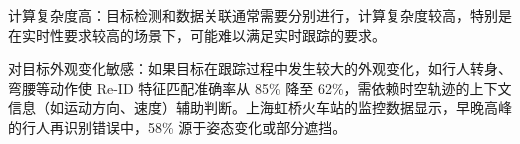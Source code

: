 计算复杂度高：目标检测和数据关联通常需要分别进行，计算复杂度较高，特别是在实时性要求较高的场景下，可能难以满足实时跟踪的要求。

对目标外观变化敏感：如果目标在跟踪过程中发生较大的外观变化，如行人转身、弯腰等动作使 Re-ID 特征匹配准确率从 85\% 降至 62\%，需依赖时空轨迹的上下文信息（如运动方向、速度）辅助判断。上海虹桥火车站的监控数据显示，早晚高峰的行人再识别错误中，58\% 源于姿态变化或部分遮挡\cite{li2023pedestrian}。
















